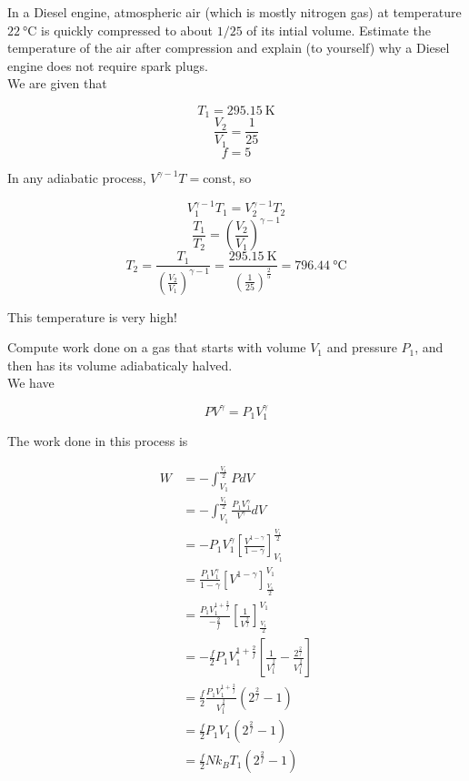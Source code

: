 \documentclass[12pt, a4paper]{article}
\newcounter{exa}
\begin{document}
\begin{texample}
In a Diesel engine, atmospheric air (which is mostly nitrogen gas) at temperature $\SI{22}{\celsius}$ is quickly compressed to about $1/25$ of its intial volume. Estimate the temperature of the air after compression and explain (to yourself) why a Diesel engine does not require spark plugs. \\

We are given that

\[T_1=\SI{295.15}{\kelvin}\]
\[\frac{V_2}{V_1}=\frac{1}{25}\]
\[f=5\]

In any adiabatic process, $V^{\gamma-1}T=\text{const}$, so

\[V_1^{\gamma-1}T_1=V_2^{\gamma-1}T_2\]
\[\frac{T_1}{T_2}=\left( \frac{V_2}{V_1} \right)^{\gamma-1}\]
\[T_2=\frac{T_1}{\left( \frac{V_2}{V_1} \right)^{\gamma-1}}=\frac{\SI{295.15}{\kelvin}}{\left( \frac{1}{25} \right)^{\frac{2}{5}}}=\SI{796.44}{\celsius}\]

This temperature is very high!
\end{texample}

\begin{texample}
Compute work done on a gas that starts with volume $V_1$ and pressure $P_1$, and then has its volume adiabaticaly halved. \\

We have

\[PV^\gamma=P_1V_1^\gamma\]

The work done in this process is

\begin{align*}
W&=-\int_{V_1}^\frac{V_1}{2} PdV \\
&=-\int_{V_1}^\frac{V_1}{2} \frac{P_1V_1^\gamma}{V^\gamma} dV \\
&=-P_1V_1^\gamma \left[ \frac{V^{1-\gamma}}{1-\gamma} \right]_{V_1}^{\frac{V_1}{2}} \\
&=\frac{P_1V_1^\gamma}{1-\gamma} \left[ V^{1-\gamma} \right]_{\frac{V_1}{2}}^{V_1} \\
&=\frac{P_1V_1^{1+\frac{2}{f}}}{-\frac{2}{f}} \left[ \frac{1}{V^{\frac{2}{f}}} \right]_{\frac{V_1}{2}}^{V_1} \\
&=-\frac{f}{2} P_1V_1^{1+\frac{2}{f}} \left[ \frac{1}{V_1^\frac{2}{f}} - \frac{2^\frac{2}{f}}{V_1^\frac{2}{f}} \right] \\
&=\frac{f}{2} \frac{P_1V_1^{1+\frac{2}{f}}}{V_1^\frac{2}{f}} \left( 2^\frac{2}{f} - 1 \right) \\
&=\frac{f}{2} P_1V_1 \left( 2^\frac{2}{f} - 1 \right) \\
&=\frac{f}{2} Nk_BT_1 \left( 2^\frac{2}{f} - 1 \right)
\end{align*}
\end{texample}
\end{document}
